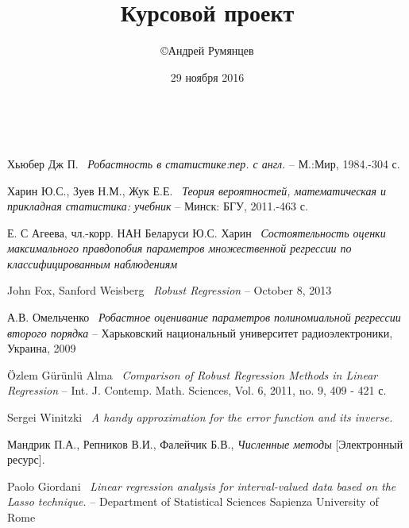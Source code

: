 \documentclass[a4paper,14pt]{extarticle}
\title{Курсовой проект}
\author{\copyright Андрей Румянцев}
\date{29 ноября 2016}
\begin{document}


\newpage 
~~~~~~~~~
\thispagestyle{empty}
\addtocounter{page}{-1}
\mbox{}
\newpage


\tableofcontents
\newpage 

% 


\newpage

 
\newpage


\newpage


\newpage


\newpage

\newpage
{}
\begin{thebibliography}{8}
    Хьюбер Дж П.~
    \textit{Робастность в статистике:пер. с англ.} --
    М.:Мир, 1984.-304 с.

    Харин Ю.С., Зуев Н.М.,
    Жук Е.Е.~
    \textit{Теория вероятностей, математическая и прикладная статистика: учебник} --
    Минск: БГУ, 2011.-463 с.

    

    Е. С Агеева, чл.-корр. НАН Беларуси Ю.С. Харин~
    \textit{Состоятельность оценки максимального правдопобия параметров множественной регрессии по классифицированным наблюдениям}

    John Fox, Sanford Weisberg~
    \textit{Robust Regression} --
    October 8, 2013

    А.В. Омельченко~
    \textit{Робастное оценивание параметров полиномиальной регрессии второго порядка} --
    Харьковский национальный университет радиоэлектроники, Украина, 2009

    \"{O}zlem G\"{u}r\"{u}nl\"{u} Alma~
    \textit{Comparison of Robust Regression Methods
    in Linear Regression} -- 
    Int. J. Contemp. Math. Sciences, Vol. 6, 2011, no. 9, 409 - 421 с.

    Sergei Winitzki~
    \textit{A handy approximation for the error function and its inverse.}

    Мандрик П.А., Репников В.И., Фалейчик Б.В.,
    \textit{Численные методы} [Электронный ресурс].

    Paolo Giordani~
    \textit{Linear regression analysis for interval-valued data based on the Lasso technique.} --
    Department of Statistical Sciences Sapienza University of Rome


\end{thebibliography}
\end{document}
